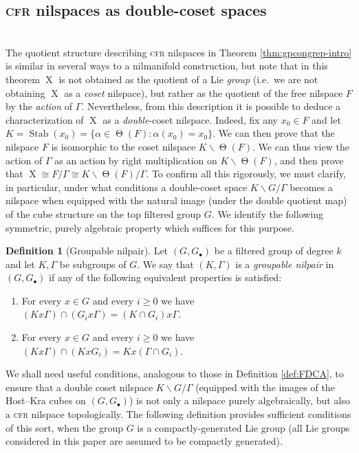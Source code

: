 \documentclass[a4paper,12pt,reqno]{amsart}
\theoremstyle{definition}
\newtheorem{defn}[theorem]{Definition}
\DeclareMathOperator{\stab}{Stab}
\DeclareMathOperator{\tran}{\Theta}
\DeclareMathOperator{\ns}{X}
\begin{document}
\subsection{\textsc{cfr} nilspaces as double-coset spaces}\hfill\\
The quotient structure describing \textsc{cfr} nilspaces in Theorem \ref{thm:gpcongrep-intro} is similar in several ways to a nilmanifold construction, but note that in this theorem $\ns$ is not obtained as the quotient of a Lie \emph{group} (i.e.\ we are not obtaining $\ns$ as a \emph{coset} nilspace), but rather as the quotient of the free nilspace $F$ by the \emph{action} of $\Gamma$. Nevertheless, from this description it is possible to deduce a characterization of $\ns$ as a \emph{double}-coset nilspace. Indeed, fix any $x_0\in F$ and let $K=\stab(x_0)=\{\alpha\in \tran(F):\alpha(x_0)=x_0\}$. We can then prove that the nilspace $F$ is isomorphic to the coset nilspace $K\backslash\!\tran(F)$. We can thus view the action of $\Gamma$ as an action by right multiplication on $ K\backslash\!\tran(F)$, and then prove that $\ns \cong F/\Gamma \cong K\backslash\!\tran(F)/\Gamma$. To confirm all this rigorously,  we must clarify, in particular, under what conditions a double-coset space $K\backslash G/\Gamma$ becomes a nilspace when equipped with the natural image (under the double quotient map) of the cube structure on the top filtered group $G$. We identify the following symmetric, purely algebraic property which suffices for this purpose.
\begin{defn}[Groupable nilpair]
Let $(G,G_\bullet)$ be a filtered group of degree $k$ and let $K,\Gamma$ be subgroups of $G$. We say that $(K,\Gamma)$ is a \emph{groupable nilpair} in $(G,G_\bullet)$ if any of the following equivalent properties is satisfied:
\begin{enumerate}
    \item For every $x\in G$ and every $i\ge 0$ we have $(Kx\Gamma)\cap(G_ix\Gamma)=(K\cap G_i)x\Gamma$.
    \item For every $x\in G$ and every $i\ge 0$ we have $(Kx\Gamma)\cap(KxG_i)=Kx(\Gamma\cap G_i)$.
\end{enumerate}
\end{defn}
\noindent We shall need useful conditions, analogous to those in Definition \ref{def:FDCA}, to ensure that a double coset nilspace $K\backslash G/\Gamma$ (equipped with the images of the Host--Kra cubes on $(G,G_\bullet)$) is not only a nilspace purely algebraically, but also a \textsc{cfr} nilspace topologically. The following definition provides sufficient conditions of this sort, when the group $G$ is a compactly-generated Lie group (all Lie groups considered in this paper are  assumed to be compactly generated).
\end{document}
